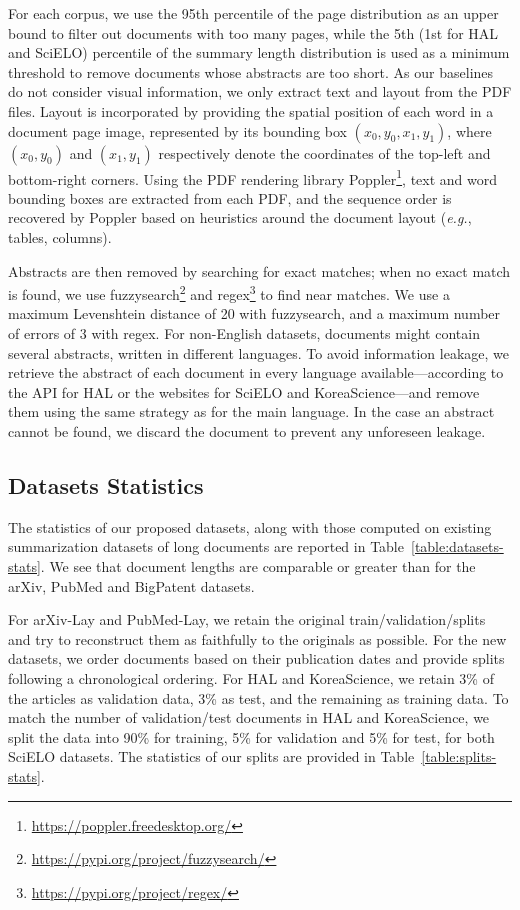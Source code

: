 For each corpus, we use the 95th percentile of the page distribution as an upper bound to filter out documents with too many pages, while the 5th (1st for HAL and SciELO) percentile of the summary length distribution is used as a minimum threshold to remove documents whose abstracts are too short. As our baselines do not consider visual information, we only extract text and layout from the PDF files. Layout is incorporated by providing the spatial position of each word in a document page image, represented by its bounding box $(x_0, y_0, x_1, y_1)$, where $(x_0, y_0)$ and $(x_1, y_1)$ respectively denote the coordinates of the top-left and bottom-right corners. Using the PDF rendering library Poppler\footnote{ \url{https://poppler.freedesktop.org/}}, text and word bounding boxes are extracted from each PDF, and the sequence order is recovered by Poppler based on heuristics around the document layout (\textit{e.g.}, tables, columns). 

Abstracts are then removed by searching for exact matches; when no exact match is found, we use fuzzysearch\footnote{ \url{https://pypi.org/project/fuzzysearch/}} and regex\footnote{ \url{https://pypi.org/project/regex/}} to find near matches. We use a maximum Levenshtein distance of 20 with fuzzysearch, and a maximum number of errors of 3 with regex. For non-English datasets, documents might contain several abstracts, written in different languages. To avoid information leakage, we retrieve the abstract of each document in every language available—according to the API for HAL or the websites for SciELO and KoreaScience—and remove them using the same strategy as for the main language. In the case an abstract cannot be found, we discard the document to prevent any unforeseen leakage. 

\subsection{Datasets Statistics}

The statistics of our proposed datasets, along with those computed on existing summarization datasets of long documents \citep{cohan2018discourse, sharma2019bigpatent} are reported in Table~\ref{table:datasets-stats}. We see that document lengths are comparable or greater than for the arXiv, PubMed and BigPatent datasets.  

For arXiv-Lay and PubMed-Lay, we retain the original train/validation/splits and try to reconstruct them as faithfully to the originals as possible. For the new datasets, we order documents based on their publication dates and provide splits following a chronological ordering. For HAL and KoreaScience, we retain 3\% of the articles as validation data, 3\% as test, and the remaining as training data. To match the number of validation/test documents in HAL and KoreaScience, we split the data into 90\% for training, 5\% for validation and 5\% for test, for both SciELO datasets. The statistics of our splits are provided in Table~\ref{table:splits-stats}.

